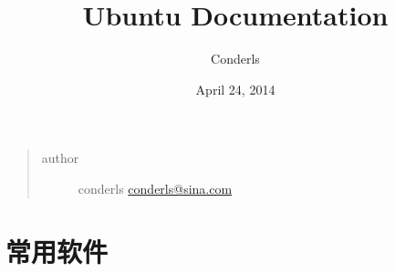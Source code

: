 \documentclass[letterpaper,10pt,english]{sphinxmanual}
\title{Ubuntu Documentation}
\date{April 24, 2014}
\author{Conderls}
\begin{document}
\maketitle
\tableofcontents
{}\label{index::doc}

\begin{quote}\begin{description}
\item[{author}] \leavevmode
conderls \href{mailto:conderls@sina.com}{conderls@sina.com}

\end{description}\end{quote}


\chapter{常用软件}
\end{document}
